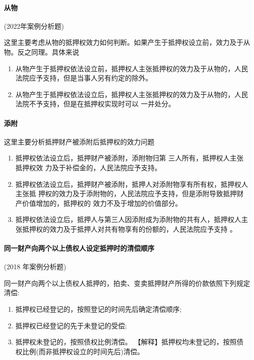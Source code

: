 \documentclass[UTF8,12pt]{ctexart}
\numberwithin{equation}{section} %
\numberwithin{figure}{section}
\numberwithin{table}{section}
\begin{document}
	
	\paragraph{从物}(2022年案例分析题)
	
	这里主要考虑从物的抵押权效力如何判断。如果产生于抵押权设立前，效力及于从物。反之同理。具体来说
	\begin{enumerate}
		\item 从物产生于抵押权依法设立前，抵押权人主张抵押权的效力及于从物的，人民法院应予支持，但是当事人另有约定的除外。
		
		\item 从物产生于抵押权依法设立后，抵押权人主张抵押权的效力及于从物的，人民法院不予支持，但是在抵押权实现时可以 一并处分。
	\end{enumerate}
	
	\paragraph{添附}
	这里主要分析抵押财产被添附后抵押权的效力问题
	\begin{enumerate}
		\item 抵押权依法设立后，抵押财产被添附，添附物归第 三人所有，抵押权人主张抵押权效 力及于补偿金的，人民法院应予支持。 
		
		\item 抵押权依法设立后，抵押财产被添附，抵押人对添附物享有所有权，抵押权人主张抵 押权的效力及于添附物的，人民法院应予支持，但是添附导致抵押财产价值增加的，抵押权的 效力不及于增加的价值部分。 
		
		\item 抵押权依法设立后，抵押人与第三人因添附成为添附物的共有人，抵押权人主张抵押权的效力及于抵押人对共有物享有的份额的，人民法院应予支持 。		
	\end{enumerate}

	
	\paragraph{同一财产向两个以上债权人设定抵押时的清偿顺序}(2018 年案例分析题) 
	
	同一财产向两个以上债权人抵押的，拍卖、变卖抵押财产所得的价款依照下列规定清偿: 
	\begin{enumerate}
		\item 抵押权已经登记的，按照登记的时间先后确定清偿顺序;
		
		\item 抵押权已经登记的先于未登记的受偿;
		
		\item 抵押权未登记的，按照债权比例清偿。 【解释】抵押权均未登记的，按照债权比例(而非抵押权设立的时间先后)清偿。
	\end{enumerate}
	
\end{document}
